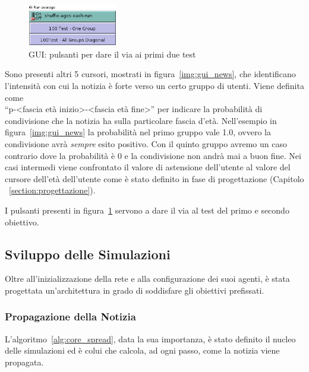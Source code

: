 \begin{figure}
  \vspace*{-20pt}
  \begin{center}
    \includegraphics[width=0.35\textwidth]{img/gui-first-second-test.png}
  \end{center}
 \vspace*{-10pt}
 \caption{GUI: 
 pulsanti per dare il via ai primi due test}
 \vspace*{-10pt}
 \label{img:gui_first_second_test}
\end{figure}
Sono presenti altri 5 cursori, mostrati in figura~\ref{img:gui_news}, che identificano l'intensità con cui la notizia è forte 
verso un certo gruppo di utenti. 
Viene definita come\\
``p-<fascia età inizio>-<fascia età fine>'' per indicare la probabilità di condivisione che la notizia ha sulla particolare
fascia d'età.
Nell'esempio in figura~\ref{img:gui_news} la probabilità nel primo gruppo vale 1.0, ovvero la condivisione avrà \emph{sempre} esito positivo.
Con il quinto gruppo avremo un caso contrario dove la probabilità è 0 e la condivisione non andrà mai a buon fine. 
Nei casi intermedi viene confrontato il valore di astensione dell'utente al valore del cursore dell'età dell'utente come è stato definito 
in fase di progettazione (Capitolo ~\ref{section:progettazione}).

I pulsanti presenti in figura~\ref{img:gui_first_second_test} servono a dare il via al test del primo e secondo obiettivo.

\subsection{Sviluppo delle Simulazioni}
Oltre all'inizializzazione della rete e alla configurazione dei suoi agenti, è stata progettata un'architettura in grado di
soddisfare gli obiettivi prefissati.



\subsubsection{Propagazione della Notizia}
L'algoritmo~\ref{alg:core_spread}, data la sua importanza, è stato definito il nucleo delle simulazioni 
ed è colui che calcola, ad ogni passo, come la notizia viene propagata. 

